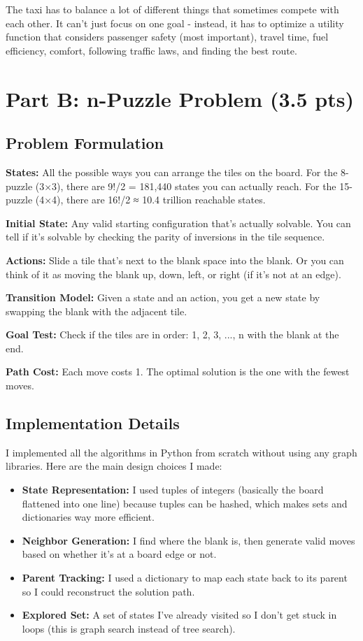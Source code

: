 \documentclass[letterpaper]{article}
\begin{document}
The taxi has to balance a lot of different things that sometimes compete with each other. It can't just focus on one goal - instead, it has to optimize a utility function that considers passenger safety (most important), travel time, fuel efficiency, comfort, following traffic laws, and finding the best route.

\section{Part B: n-Puzzle Problem (3.5 pts)}

\subsection{Problem Formulation}

\textbf{States:} All the possible ways you can arrange the tiles on the board. For the 8-puzzle (3×3), there are 9!/2 = 181,440 states you can actually reach. For the 15-puzzle (4×4), there are 16!/2 ≈ 10.4 trillion reachable states.

\textbf{Initial State:} Any valid starting configuration that's actually solvable. You can tell if it's solvable by checking the parity of inversions in the tile sequence.

\textbf{Actions:} Slide a tile that's next to the blank space into the blank. Or you can think of it as moving the blank up, down, left, or right (if it's not at an edge).

\textbf{Transition Model:} Given a state and an action, you get a new state by swapping the blank with the adjacent tile.

\textbf{Goal Test:} Check if the tiles are in order: 1, 2, 3, ..., n with the blank at the end.

\textbf{Path Cost:} Each move costs 1. The optimal solution is the one with the fewest moves.

\subsection{Implementation Details}

I implemented all the algorithms in Python from scratch without using any graph libraries. Here are the main design choices I made:

\begin{itemize}
    \item \textbf{State Representation:} I used tuples of integers (basically the board flattened into one line) because tuples can be hashed, which makes sets and dictionaries way more efficient.
    \item \textbf{Neighbor Generation:} I find where the blank is, then generate valid moves based on whether it's at a board edge or not.
    \item \textbf{Parent Tracking:} I used a dictionary to map each state back to its parent so I could reconstruct the solution path.
    \item \textbf{Explored Set:} A set of states I've already visited so I don't get stuck in loops (this is graph search instead of tree search).
\end{itemize}
\end{document}

